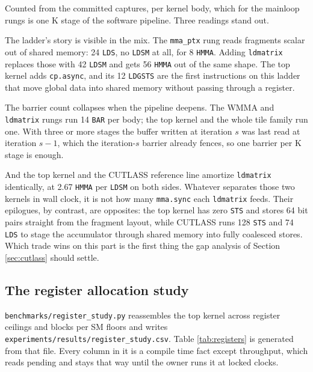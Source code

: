 Counted from the committed captures, per kernel body, which for the mainloop rungs
is one K stage of the software pipeline. Three readings stand out.

The ladder's story is visible in the mix. The \texttt{mma\_ptx} rung reads
fragments scalar out of shared memory: 24 \texttt{LDS}, no \texttt{LDSM} at all,
for 8 \texttt{HMMA}. Adding \texttt{ldmatrix} replaces those with 42
\texttt{LDSM} and gets 56 \texttt{HMMA} out of the same shape. The top kernel adds
\texttt{cp.async}, and its 12 \texttt{LDGSTS} are the first instructions on this
ladder that move global data into shared memory without passing through a
register.

The barrier count collapses when the pipeline deepens. The WMMA and
\texttt{ldmatrix} rungs run 14 \texttt{BAR} per body; the top kernel and the whole
tile family run one. With three or more stages the buffer written at iteration $s$
was last read at iteration $s-1$, which the iteration-$s$ barrier already fences,
so one barrier per K stage is enough.

And the top kernel and the CUTLASS reference line amortize \texttt{ldmatrix}
identically, at 2.67 \texttt{HMMA} per \texttt{LDSM} on both sides. Whatever
separates those two kernels in wall clock, it is not how many \texttt{mma.sync}
each \texttt{ldmatrix} feeds. Their epilogues, by contrast, are opposites: the top
kernel has zero \texttt{STS} and stores 64 bit pairs straight from the fragment
layout, while CUTLASS runs 128 \texttt{STS} and 74 \texttt{LDS} to stage the
accumulator through shared memory into fully coalesced stores. Which trade wins on
this part is the first thing the gap analysis of Section \ref{sec:cutlass} should
settle.

\subsection{The register allocation study}

\texttt{benchmarks/register\_study.py} reassembles the top kernel across register
ceilings and blocks per SM floors and writes
\texttt{experiments/results/register\_study.csv}. Table \ref{tab:registers} is
generated from that file. Every column in it is a compile time fact except
throughput, which reads pending and stays that way until the owner runs it at
locked clocks.

\begin{table}[htbp]
\centering

\caption{The register allocation study, from
\texttt{experiments/results/register\_study.csv}. Registers, spills, occupancy and
the limiter are compile time facts from ptxas; throughput is pending.}
\label{tab:registers}
\end{table}


